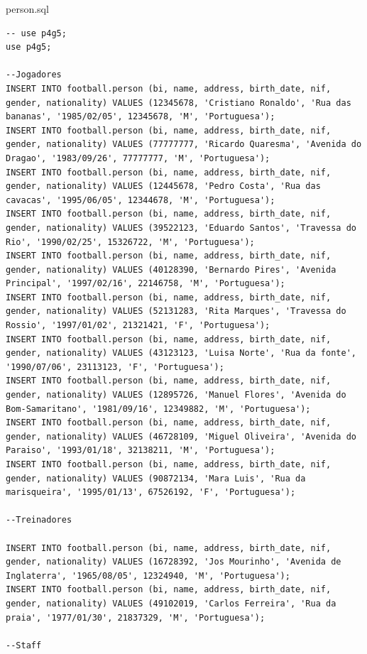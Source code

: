 \documentclass[pdftex,12pt,a4paper]{report}
\begin{document}
person.sql
\begin{lstlisting} 
-- use p4g5;
use p4g5;

--Jogadores
INSERT INTO football.person (bi, name, address, birth_date, nif, gender, nationality) VALUES (12345678, 'Cristiano Ronaldo', 'Rua das bananas', '1985/02/05', 12345678, 'M', 'Portuguesa');
INSERT INTO football.person (bi, name, address, birth_date, nif, gender, nationality) VALUES (77777777, 'Ricardo Quaresma', 'Avenida do Dragao', '1983/09/26', 77777777, 'M', 'Portuguesa'); 
INSERT INTO football.person (bi, name, address, birth_date, nif, gender, nationality) VALUES (12445678, 'Pedro Costa', 'Rua das cavacas', '1995/06/05', 12344678, 'M', 'Portuguesa'); 
INSERT INTO football.person (bi, name, address, birth_date, nif, gender, nationality) VALUES (39522123, 'Eduardo Santos', 'Travessa do Rio', '1990/02/25', 15326722, 'M', 'Portuguesa'); 
INSERT INTO football.person (bi, name, address, birth_date, nif, gender, nationality) VALUES (40128390, 'Bernardo Pires', 'Avenida Principal', '1997/02/16', 22146758, 'M', 'Portuguesa'); 
INSERT INTO football.person (bi, name, address, birth_date, nif, gender, nationality) VALUES (52131283, 'Rita Marques', 'Travessa do Rossio', '1997/01/02', 21321421, 'F', 'Portuguesa');
INSERT INTO football.person (bi, name, address, birth_date, nif, gender, nationality) VALUES (43123123, 'Luisa Norte', 'Rua da fonte', '1990/07/06', 23113123, 'F', 'Portuguesa'); 
INSERT INTO football.person (bi, name, address, birth_date, nif, gender, nationality) VALUES (12895726, 'Manuel Flores', 'Avenida do Bom-Samaritano', '1981/09/16', 12349882, 'M', 'Portuguesa');
INSERT INTO football.person (bi, name, address, birth_date, nif, gender, nationality) VALUES (46728109, 'Miguel Oliveira', 'Avenida do Paraiso', '1993/01/18', 32138211, 'M', 'Portuguesa');
INSERT INTO football.person (bi, name, address, birth_date, nif, gender, nationality) VALUES (90872134, 'Mara Luis', 'Rua da marisqueira', '1995/01/13', 67526192, 'F', 'Portuguesa'); 

--Treinadores

INSERT INTO football.person (bi, name, address, birth_date, nif, gender, nationality) VALUES (16728392, 'Jos Mourinho', 'Avenida de Inglaterra', '1965/08/05', 12324940, 'M', 'Portuguesa');
INSERT INTO football.person (bi, name, address, birth_date, nif, gender, nationality) VALUES (49102019, 'Carlos Ferreira', 'Rua da praia', '1977/01/30', 21837329, 'M', 'Portuguesa'); 

--Staff


\end{lstlisting}
\end{document}
